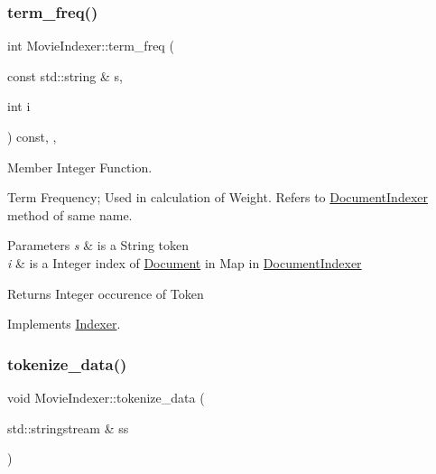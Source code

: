\subsubsection{\texorpdfstring{term\+\_\+freq()}{term\_freq()}}
{\footnotesize\ttfamily int Movie\+Indexer\+::term\+\_\+freq (\begin{DoxyParamCaption}\item[{const std\+::string \&}]{s,  }\item[{int}]{i }\end{DoxyParamCaption}) const\hspace{0.3cm}{\ttfamily [override]}, {\ttfamily [private]}, {\ttfamily [virtual]}}



Member Integer Function. 

Term Frequency; Used in calculation of Weight. Refers to \hyperlink{class_document_indexer}{Document\+Indexer} method of same name.


\begin{DoxyParams}{Parameters}
{\em s} & is a String token \\
\hline
{\em i} & is a Integer index of \hyperlink{class_document}{Document} in Map in \hyperlink{class_document_indexer}{Document\+Indexer} \\
\hline
\end{DoxyParams}
\begin{DoxyReturn}{Returns}
Integer occurence of Token 
\end{DoxyReturn}


Implements \hyperlink{class_indexer_a96e17172c76abb679e7cd2ff4606ce4a}{Indexer}.

\mbox{\label{class_movie_indexer_a21e8c7c3da12f8704e36b727cd530658}} 
\subsubsection{\texorpdfstring{tokenize\+\_\+data()}{tokenize\_data()}}
{\footnotesize\ttfamily void Movie\+Indexer\+::tokenize\+\_\+data (\begin{DoxyParamCaption}\item[{std\+::stringstream \&}]{ss }\end{DoxyParamCaption})\hspace{0.3cm}{\ttfamily [private]}}



